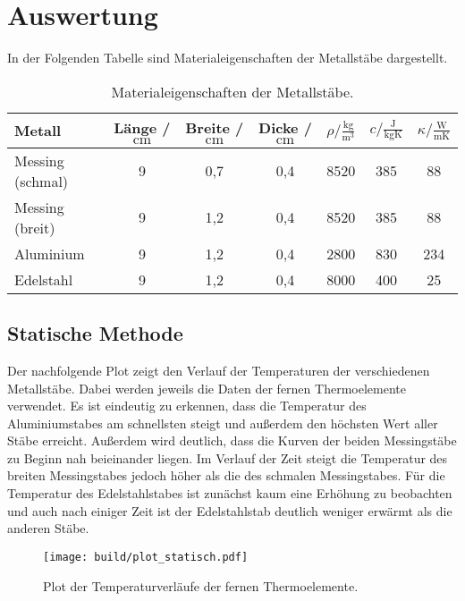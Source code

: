 \section{Auswertung}
\label{sec:Auswertung}
In der Folgenden Tabelle sind Materialeigenschaften der Metallstäbe dargestellt.
\begin{table} [H]
  \centering
  \caption{Materialeigenschaften der Metallstäbe.}
  \label{tab:materialeigenschaften}
  \begin{tabular}{l S[table-format=1.0] S[table-format=1.1] S[table-format=1.1] S[table-format=4.0] S[table-format=3.0] S[table-format=3.0]}
    \toprule
    {Metall} & {Länge / $\unit{\centi\metre}$} & {Breite / $\unit{\centi\metre}$} & %
    {Dicke / $\unit{\centi\metre}$} & {$\rho / \frac{\unit{\kilo\gram}}{\unit{\cubic\metre}}$} &%
     {$c / \frac{\unit{\joule}}{\unit{\kilo\gram\kelvin}}$} & {$\kappa / \frac{\unit{\watt}}{\unit{\metre\kelvin}}$ \cite{czichos}}\\
    \midrule
    Messing (schmal)  & 9 & 0,7 & 0,4 & 8520 & 385 & 88  \\
    Messing (breit)   & 9 & 1,2 & 0,4 & 8520 & 385 & 88  \\
    Aluminium         & 9 & 1,2 & 0,4 & 2800 & 830 & 234 \\
    Edelstahl         & 9 & 1,2 & 0,4 & 8000 & 400 & 25  \\
    \bottomrule
  \end{tabular}
\end{table}

\subsection{Statische Methode}
\label{sec:auswertung statische methode}
Der nachfolgende Plot zeigt den Verlauf der Temperaturen der verschiedenen Metallstäbe. Dabei werden jeweils die Daten der
fernen Thermoelemente verwendet. Es ist eindeutig zu erkennen, dass die Temperatur des Aluminiumstabes am schnellsten steigt
und außerdem den höchsten Wert aller Stäbe erreicht. Außerdem wird deutlich, dass die Kurven der beiden Messingstäbe zu Beginn
nah beieinander liegen. Im Verlauf der Zeit steigt die Temperatur des breiten Messingstabes jedoch höher als die des schmalen
Messingstabes. Für die Temperatur des Edelstahlstabes ist zunächst kaum eine Erhöhung zu beobachten und auch nach einiger Zeit
ist der Edelstahlstab deutlich weniger erwärmt als die anderen Stäbe.

\begin{figure}
  \centering
  \texttt{[image: build/plot\_statisch.pdf]}
  \caption{Plot der Temperaturverläufe der fernen Thermoelemente.}
  \label{fig:temperaturverlauf statisch, fern}
\end{figure}

